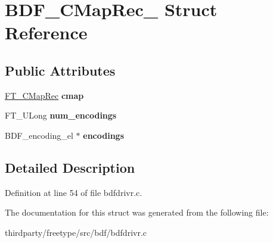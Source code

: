 \hypertarget{struct_b_d_f___c_map_rec__}{}\section{B\+D\+F\+\_\+\+C\+Map\+Rec\+\_\+ Struct Reference}
\label{struct_b_d_f___c_map_rec__}
\subsection*{Public Attributes}
\begin{DoxyCompactItemize}
\item 
\mbox{\label{struct_b_d_f___c_map_rec___a501e9352975c1d69528def32adad791e}} 
\hyperlink{struct_f_t___c_map_rec__}{F\+T\+\_\+\+C\+Map\+Rec} {\bfseries cmap}
\item 
\mbox{\label{struct_b_d_f___c_map_rec___a00c7bc8055ddee6858c641c08ece874b}} 
F\+T\+\_\+\+U\+Long {\bfseries num\+\_\+encodings}
\item 
\mbox{\label{struct_b_d_f___c_map_rec___ae765d57d6633b6453d98a3116ad37d92}} 
B\+D\+F\+\_\+encoding\+\_\+el $\ast$ {\bfseries encodings}
\end{DoxyCompactItemize}


\subsection{Detailed Description}


Definition at line 54 of file bdfdrivr.\+c.



The documentation for this struct was generated from the following file\+:\begin{DoxyCompactItemize}
\item 
thirdparty/freetype/src/bdf/bdfdrivr.\+c\end{DoxyCompactItemize}
